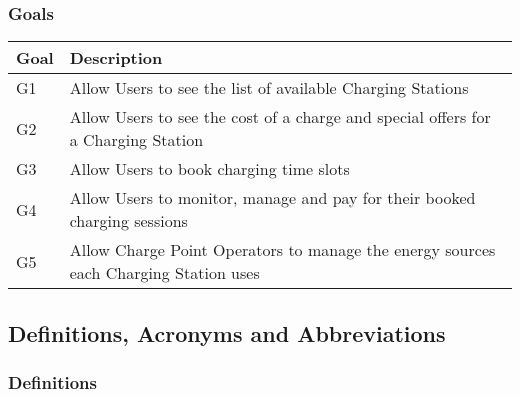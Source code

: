 \documentclass[11pt]{article}
\begin{document}

\subsubsection{Goals}

\begin{table}[H]
    \centering
    \setlength{\tabcolsep}{18pt}
    \renewcommand{\arraystretch}{1.2}
    \begin{tabularx}{\textwidth}{|>{\centering\hsize=0.3\hsize}X|>{\hsize=1.7\hsize}X|}
        \hline
        \textbf{Goal} & \textbf{Description} \\
        \hline
        G1 & Allow Users to see the list of available Charging Stations \\
        \hline
        G2 & Allow Users to see the cost of a charge and special offers for a Charging Station \\
        \hline
        G3 & Allow Users to book charging time slots \\
        \hline
        G4 & Allow Users to monitor, manage and pay for their booked charging sessions \\
        \hline
        G5 & Allow Charge Point Operators to manage the energy sources each Charging Station uses \\
        \hline
    \end{tabularx}
    \label{tab:goals}
\end{table}

\subsection{Definitions, Acronyms and Abbreviations}

\subsubsection{Definitions}
\end{document}

